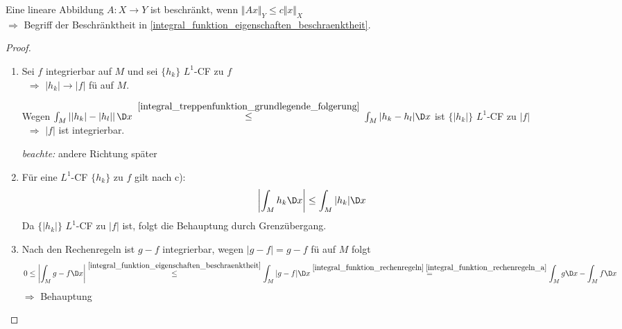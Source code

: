 \begin{underlinedenvironment}[Hinweis]
	Eine lineare Abbildung $A:X\to Y$ ist beschränkt, wenn $\Vert Ax\Vert_Y \le c\Vert x \Vert _X$ \\
	$\Rightarrow$ Begriff der Beschränktheit in \ref{integral_funktion_eigenschaften_beschraenktheit}.
\end{underlinedenvironment}
\begin{proof}\hspace*{0pt}
	\NoEndMark
	\begin{enumerate}[label={zu \alph*)},topsep=\dimexpr -\baselineskip / 2\relax,leftmargin=\widthof{\texttt{zu b)\ }}]
		\item Sei $f$ integrierbar auf $M$ und sei $\{ h_k \}$ $L^1$-CF zu $f$ \\
		\ $\Rightarrow$ $\vert h_k \vert\to \vert f \vert$ \gls{fü} auf $M$.
		
		Wegen $\int_M \left\vert \vert h_k \vert - \vert h_l \vert\right\vert \D x$ $\overset{\cref{integral_treppenfunktion_grundlegende_folgerung}}{\le}$ $\int_M \vert h_k - h_l \vert \D x$ ist $\{ \vert h_k\vert \}$ $L^1$-CF zu $\vert f \vert$ \\
		\ $\Rightarrow$ $\vert f \vert$ ist integrierbar.
		
		\emph{beachte:} andere Richtung später
		
		\item Für eine $L^1$-CF $\{ h_k\}$ zu $f$ gilt nach  c): \begin{align*}
			\left\vert \int_M h_k \D x \right\vert \le \int_M \vert h_k\vert \D x
		\end{align*}
		Da $\{ \vert h_k \vert \}$ $L^1$-CF zu $\vert f \vert$ ist, folgt die Behauptung durch Grenzübergang.
		
		\item Nach den Rechenregeln ist $g - f$ integrierbar, wegen $\vert g - f\vert = g - f$ \gls{fü} auf $M$ folgt \begin{align*}
			0 \le \left\vert \int_M g - f\D x\right\vert\overset{\ref{integral_funktion_eigenschaften_beschraenktheit}}{\le} \int_M \vert g - f\vert \D x \overset{ \cref{integral_funktion_rechenregeln}\;\ref{integral_funktion_rechenregeln_a}}{=} \int_M g \D x - \int_M f \D x
		\end{align*}
		$\Rightarrow$ Behauptung
		

\end{enumerate}
\end{proof}
